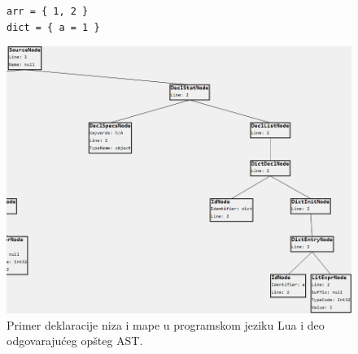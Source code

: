 \begin{figure}[h!]
\begin{lstlisting}
arr = { 1, 2 }
dict = { a = 1 }
\end{lstlisting}
\centering
\includegraphics[scale=0.62]{images/lua_ast_decl_cropped.png}
\caption{Primer deklaracije niza i mape u programskom jeziku Lua i deo odgovarajućeg opšteg AST.}
\label{fig:MyASTExampleLuaDeclaration}
\end{figure}

